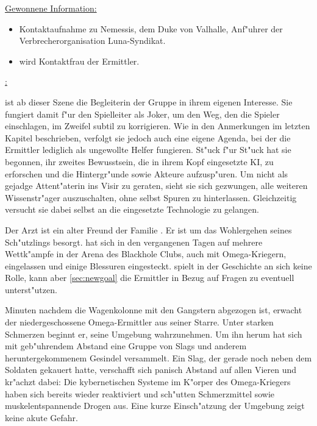\begin{remarks}
	\underline{Gewonnene Information:}
	
	\begin{itemize}
		\item Kontaktaufnahme zu Nemessis, dem Duke von Valhalle, Anf"uhrer der Verbrecherorganisation Luna-Syndikat.
		\item \xl{} wird Kontaktfrau der Ermittler.
	\end{itemize}

	\underline{\xl{}:}

	\xl{} ist ab dieser Szene die Begleiterin der Gruppe in ihrem eigenen Interesse. Sie fungiert damit f"ur den Spielleiter als Joker, um den Weg, den die Spieler einschlagen, im Zweifel subtil zu korrigieren. Wie in den Anmerkungen im letzten Kapitel beschrieben, verfolgt sie jedoch auch eine eigene Agenda, bei der die Ermittler lediglich als ungewollte Helfer fungieren. St"uck f"ur St"uck hat sie begonnen, ihr zweites Bewusstsein, die in ihrem Kopf eingesetzte KI, zu erforschen und die Hintergr"unde sowie Akteure aufzusp"uren.  Um nicht als gejadge Attent"aterin ins Visir zu geraten, sieht sie sich gezwungen, alle weiteren Wissenstr"ager auszuschalten, ohne selbst Spuren zu hinterlassen. Gleichzeitig versucht sie dabei selbst an die eingesetzte Technologie zu gelangen.
\end{remarks}

\begin{remarks}
	\underline{ }

	Der Arzt   ist ein alter Freund der Familie . Er ist um das Wohlergehen seines Sch"utzlings \xl{} besorgt. \xl{} hat sich in den vergangenen Tagen auf mehrere Wettk"ampfe in der Arena des Blackhole Clubs, auch mit Omega-Kriegern, eingelassen und einige Blessuren eingesteckt.   spielt in der Geschichte an sich keine Rolle, kann aber  \cref{sec:newgoal} die Ermittler in Bezug auf Fragen zu \xl{} eventuell unterst"utzen.
\end{remarks}



Minuten nachdem die Wagenkolonne mit den Gangstern abgezogen ist, erwacht der niedergeschossene Omega-Ermittler aus seiner Starre. Unter starken Schmerzen beginnt er, seine Umgebung wahrzunehmen. Um ihn herum hat sich mit geb"uhrendem Abstand eine Gruppe von Slags und anderem heruntergekommenem Gesindel versammelt. Ein Slag, der gerade noch neben dem Soldaten gekauert hatte, verschafft sich panisch Abstand auf allen Vieren und kr"achzt dabei:  Die kybernetischen Systeme im K"orper des Omega-Kriegers haben sich bereits wieder reaktiviert und sch"utten Schmerzmittel sowie muskelentspannende Drogen aus. Eine kurze Einsch"atzung der Umgebung zeigt keine akute Gefahr.

